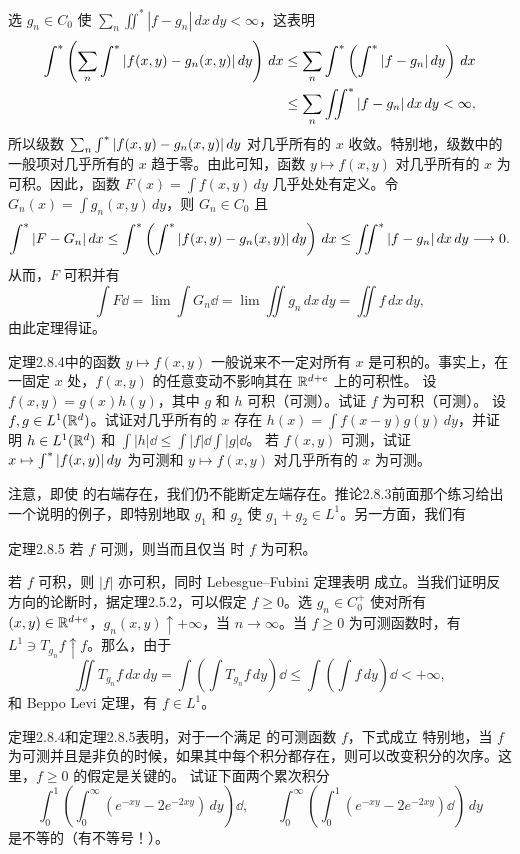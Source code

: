 \Proof 选 $g_n\in C_0$ 使 $\sum_n\iint^*|f-g_n|\,dx\,dy<\infty$，这表明
\[\begin{aligned}\int^{*}\left(\sum_n\int^{*}|f(x,y)-g_n(x,y)|\,dy\right)\,dx
&\le\sum_n\int^{*}\left(\int^{*}|f-g_n|\,dy\right)\,dx\\&\le\sum_n\iint^*|f-g_n|\,dx\,dy<\infty,\end{aligned}\]
所以级数 $\sum_n\int^{*}|f(x,y)-g_n(x,y)|\,dy$ 对几乎所有的 $x$ 收敛。特别地，级数中的一般项对几乎所有的 $x$ 趋于零。由此可知，函数 $y\mapsto f(x,y)$ 对几乎所有的 $x$ 为可积。因此，函数 $F(x)=\int f(x,y)\,dy$ 几乎处处有定义。令 $G_n(x)=\int g_n(x,y)\,dy$，则 $G_n\in C_0$ 且
\[\int^{*}|F-G_n|\,dx\le\int^{*}\left(\int^{*}|f(x,y)-g_n(x,y)|\,dy\right)\,dx\le\iint^*|f-g_n|\,dx\,dy\longrightarrow0.\]
从而，$F$ 可积并有
\[\int F\dd=\lim\int G_n\dd=\lim\iint g_n\,dx\,dy=\iint f\,dx\,dy,\]
由此定理得证。

定理2.8.4中的函数 $y\mapsto f(x,y)$ 一般说来不一定对所有 $x$ 是可积的。事实上，在一固定 $x$ 处，$f(x,y)$ 的任意变动不影响其在 $\mathbb R^{d+e}$ 上的可积性。
\Exercise 设 $f(x,y)=g(x)h(y)$，其中 $g$ 和 $h$ 可积（可测）。试证 $f$ 为可积（可测）。
\Exercise 设 $f,g\in L^1(\mathbb R^d)$。试证对几乎所有的 $x$ 存在 $h(x)=\int f(x-y)g(y)\,dy$，并证明 $h\in L^1(\mathbb R^d)$ 和 $\int|h|\dd\le\int|f|\dd\int|g|\dd$。
\Exercise 若 $f(x,y)$ 可测，试证 $x\mapsto\int^{*}|f(x,y)|\,dy$ 为可测和 $y\mapsto f(x,y)$ 对几乎所有的 $x$ 为可测。

注意，即使  的右端存在，我们仍不能断定左端存在。推论2.8.3前面那个练习给出一个说明的例子，即特别地取 $g_1$ 和 $g_2$ 使 $g_1+g_2\in L^1$。另一方面，我们有
\begin{statement}{定理}{2.8.5}
若 $f$ 可测，则当而且仅当
时 $f$ 为可积。
\end{statement}
\Proof 若 $f$ 可积，则 $|f|$ 亦可积，同时 Lebesgue--Fubini 定理表明  成立。当我们证明反方向的论断时，据定理2.5.2，可以假定 $f\ge0$。选 $g_n\in C_0^+$ 使对所有 $(x,y)\in\mathbb R^{d+e}$，$g_n(x,y)\uparrow+\infty$，当 $n\to\infty$。当 $f\ge0$ 为可测函数时，有 $L^1\ni T_{g_n}f\uparrow f$。那么，由于
\[\iint T_{g_n}f\,dx\,dy=\int\left(\int T_{g_n}f\,dy\right)\dd\le\int\left(\int f\,dy\right)\dd<+\infty,\]
和 Beppo Levi 定理，有 $f\in L^1$。

定理2.8.4和定理2.8.5表明，对于一个满足  的可测函数 $f$，下式成立
特别地，当 $f$ 为可测并且是非负的时候，如果其中每个积分都存在，则可以改变积分的次序。这里，$f\ge0$ 的假定是关键的。
\Exercise 试证下面两个累次积分
\[\int_0^1\left(\int_0^\infty(e^{-xy}-2e^{-2xy})\,dy\right)\dd,\qquad\int_0^\infty\left(\int_0^1(e^{-xy}-2e^{-2xy})\dd\right)\,dy\]
是不等的（有不等号！）。

